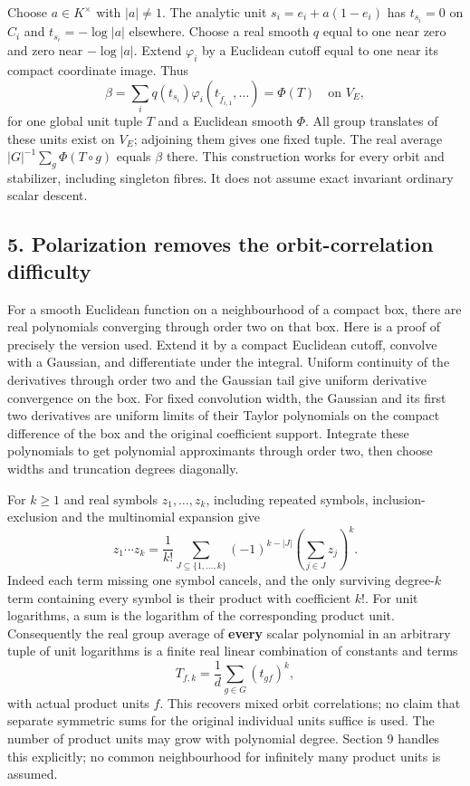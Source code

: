 \documentclass[11pt]{article}
\begin{document}
Choose \(a\in K^\times\) with \(|a|\ne1\). The analytic unit
\(s_i=e_i+a(1-e_i)\) has \(t_{s_i}=0\) on \(C_i\) and
\(t_{s_i}=-\log|a|\) elsewhere. Choose a real smooth \(q\) equal to one
near zero and zero near \(-\log|a|\). Extend \(\varphi_i\) by a
Euclidean cutoff equal to one near its compact coordinate image. Thus \[
 \beta=\sum_i q(t_{s_i})\varphi_i(t_{\widetilde f_{i,1}},\ldots)
                          =\Phi(T)\quad\text{on }V_E,   \tag{8}
\] for one global unit tuple \(T\) and a Euclidean smooth \(\Phi\). All
group translates of these units exist on \(V_E\); adjoining them gives
one fixed tuple. The real average \(|G|^{-1}\sum_g\Phi(T\circ g)\)
equals \(\beta\) there. This construction works for every orbit and
stabilizer, including singleton fibres. It does not assume exact
invariant ordinary scalar descent.

\subsection{5. Polarization removes the orbit-correlation
difficulty}\label{polarization-removes-the-orbit-correlation-difficulty}

For a smooth Euclidean function on a neighbourhood of a compact box,
there are real polynomials converging through order two on that box.
Here is a proof of precisely the version used. Extend it by a compact
Euclidean cutoff, convolve with a Gaussian, and differentiate under the
integral. Uniform continuity of the derivatives through order two and
the Gaussian tail give uniform derivative convergence on the box. For
fixed convolution width, the Gaussian and its first two derivatives are
uniform limits of their Taylor polynomials on the compact difference of
the box and the original coefficient support. Integrate these
polynomials to get polynomial approximants through order two, then
choose widths and truncation degrees diagonally.

For \(k\ge1\) and real symbols \(z_1,\ldots,z_k\), including repeated
symbols, inclusion-exclusion and the multinomial expansion give \[
 z_1\cdots z_k=\frac1{k!}\sum_{J\subseteq\{1,\ldots,k\}}
            (-1)^{k-|J|}\left(\sum_{j\in J}z_j\right)^k. \tag{9}
\] Indeed each term missing one symbol cancels, and the only surviving
degree-\(k\) term containing every symbol is their product with
coefficient \(k!\). For unit logarithms, a sum is the logarithm of the
corresponding product unit. Consequently the real group average of
\textbf{every} scalar polynomial in an arbitrary tuple of unit
logarithms is a finite real linear combination of constants and terms \[
        T_{f,k}=\frac1d\sum_{g\in G}(t_{gf})^k,          \tag{10}
\] with actual product units \(f\). This recovers mixed orbit
correlations; no claim that separate symmetric sums for the original
individual units suffice is used. The number of product units may grow
with polynomial degree. Section 9 handles this explicitly; no common
neighbourhood for infinitely many product units is assumed.
\end{document}
